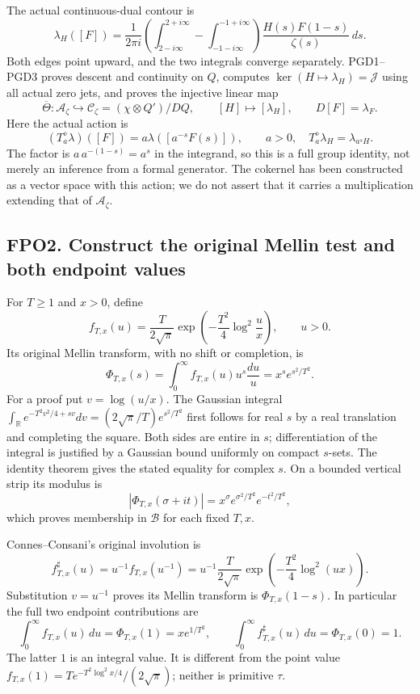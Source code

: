 The actual continuous-dual contour is \[
\lambda_H([F])=\frac1{2\pi i}
 \left(\int_{2-i\infty}^{2+i\infty}-\int_{-1-i\infty}^{-1+i\infty}\right)
 \frac{H(s)F(1-s)}{\zeta(s)}\,ds.
\tag{FPO1.4}
\] Both edges point upward, and the two integrals converge separately.
PGD1--PGD3 proves descent and continuity on \(Q\), computes
\(\ker(H\mapsto\lambda_H)=\mathcal J\) using all actual zero jets, and
proves the injective linear map \[
\overline\Theta:\mathcal A_\zeta\hookrightarrow
\mathcal C_\zeta=(\chi\otimes Q')/D Q,
\qquad [H]\longmapsto[\lambda_H],\qquad D[F]=\lambda_F.
\tag{FPO1.5}
\] Here the actual action is \[
(T_a^\diamond\lambda)([F])=a\lambda([a^{-s}F(s)]),\qquad a>0,
\quad T_a^\diamond\lambda_H=\lambda_{a^sH}.
\tag{FPO1.6}
\] The factor is \(a\,a^{-(1-s)}=a^s\) in the integrand, so this is a
full group identity, not merely an inference from a formal generator.
The cokernel has been constructed as a vector space with this action; we
do not assert that it carries a multiplication extending that of
\(\mathcal A_\zeta\).

\subsection{FPO2. Construct the original Mellin test and both endpoint
values}\label{fpo2.-construct-the-original-mellin-test-and-both-endpoint-values}

For \(T\ge1\) and \(x>0\), define \[
f_{T,x}(u)=\frac{T}{2\sqrt\pi}
 \exp\!\left(-\frac{T^2}{4}\log^2\frac ux\right),\qquad u>0.
\tag{FPO2.1}
\] Its original Mellin transform, with no shift or completion, is \[
\Phi_{T,x}(s)=\int_0^\infty f_{T,x}(u)u^s\frac{du}{u}
 =x^s e^{s^2/T^2}.
\tag{FPO2.2}
\] For a proof put \(v=\log(u/x)\). The Gaussian integral
\(\int_{\mathbb R}e^{-T^2v^2/4+sv}dv=(2\sqrt\pi/T)e^{s^2/T^2}\) first
follows for real \(s\) by a real translation and completing the square.
Both sides are entire in \(s\); differentiation of the integral is
justified by a Gaussian bound uniformly on compact \(s\)-sets. The
identity theorem gives the stated equality for complex \(s\). On a
bounded vertical strip its modulus is \[
|\Phi_{T,x}(\sigma+it)|=x^\sigma e^{\sigma^2/T^2}e^{-t^2/T^2},
\] which proves membership in \(\mathcal B\) for each fixed \(T,x\).

Connes--Consani's original involution is \[
f_{T,x}^{\sharp}(u)=u^{-1}f_{T,x}(u^{-1})
 =u^{-1}\frac{T}{2\sqrt\pi}
 \exp\!\left(-\frac{T^2}{4}\log^2(ux)\right).
\tag{FPO2.3}
\] Substitution \(v=u^{-1}\) proves its Mellin transform is
\(\Phi_{T,x}(1-s)\). In particular the full two endpoint contributions
are \[
\int_0^\infty f_{T,x}(u)\,du=\Phi_{T,x}(1)=xe^{1/T^2},
\qquad
\int_0^\infty f_{T,x}^{\sharp}(u)\,du=\Phi_{T,x}(0)=1.
\tag{FPO2.4}
\] The latter \(1\) is an integral value. It is different from the point
value \(f_{T,x}(1)=T e^{-T^2\log^2x/4}/(2\sqrt\pi)\); neither is
primitive \(\tau\).

